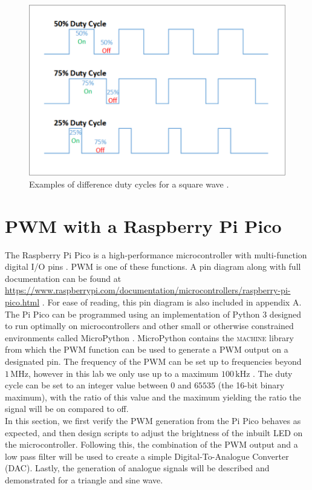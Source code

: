 \documentclass[%
 reprint,
 amsmath,amssymb,
 aps,
]{revtex4-2}
\begin{document}
    \begin{figure}
        \includegraphics[width=0.9\columnwidth]{Images/pwm.png}
        \caption{\label{fig:PWM}Examples of difference duty cycles for a square wave \cite{ucd}.}
    \end{figure}


\section{PWM with a Raspberry Pi Pico}
The Raspberry Pi Pico is a high-performance microcontroller with multi-function digital I/O pins \cite{Pi, ucd}. PWM is one of these functions. A pin diagram along with full documentation can be found at \url{https://www.raspberrypi.com/documentation/microcontrollers/raspberry-pi-pico.html} \cite{Pi}. For ease of reading, this pin diagram is also included in appendix A.\\

The Pi Pico can be programmed using an implementation of Python 3 designed to run optimally on microcontrollers and other small or otherwise constrained environments called MicroPython \cite{micropython}. MicroPython contains the \textsc{machine} library from which the \textsc{PWM} function can be used to generate a PWM output on a designated pin. The frequency of the PWM can be set up to frequencies beyond $1\,\text{MHz}$, however in this lab we only use up to a maximum $100 \,\text{kHz}$ \cite{ucd}. The duty cycle can be set to an integer value between $0$ and $65535$ (the 16-bit binary maximum), with the ratio of this value and the maximum yielding the ratio the signal will be on compared to off.\\

In this section, we first verify the PWM generation from the Pi Pico behaves as expected, and then design scripts to adjust the brightness of the inbuilt LED on the microcontroller. Following this, the combination of the PWM output and a low pass filter will be used to create a simple Digital-To-Analogue Converter (DAC). Lastly, the generation of analogue signals will be described and demonstrated for a triangle and sine wave.
    
\end{document}
